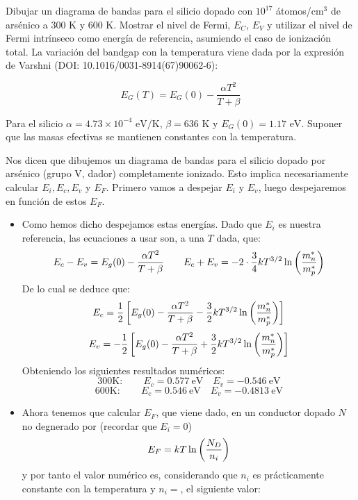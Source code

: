 \begin{texercise}
	Dibujar un diagrama de bandas para el silicio dopado con $10^{17}$ átomos/cm$^3$ de arsénico a 300 K y 600 K. Mostrar el nivel de Fermi, $E_C$, $E_V$ y utilizar el nivel de Fermi intrínseco como energía de referencia, asumiendo el caso de ionización total. La variación del bandgap con la temperatura viene dada por la expresión de Varshni (DOI: 10.1016/0031-8914(67)90062-6):

	\begin{equation}
		E_G(T) = E_G(0) - \frac{\alpha T^2}{T + \beta}
	\end{equation}
	
	Para el silicio $\alpha = 4.73 \times 10^{-4} \text{ eV/K}$, $\beta = 636 \text{ K}$ y $E_G(0) = 1.17 \text{ eV}$. Suponer que las masas efectivas se mantienen constantes con la temperatura.
	
	\tcblower

	Nos dicen que dibujemos un diagrama de bandas para el silicio dopado por arsénico (grupo V, dador) completamente ionizado. Esto implica necesariamente calcular $E_i,E_c,E_v$ y $E_F$. Primero vamos a despejar $E_i$ y $E_v$, luego despejaremos en función de estos $E_F$. 

	\begin{itemize}
		\item Como hemos dicho despejamos estas energías. Dado que $E_i$ es nuestra referencia, las ecuaciones a usar son, a una $T$ dada, que:
		\begin{equation}
			E_c-E_v = E_g(0) - \frac{\alpha T^2}{T+\beta} \qquad E_c+E_v=-2 \cdot \frac{3}{4} kT^{3/2} \ln \left( \frac{m_n^*}{m_p^*} \right)
		\end{equation}
		De lo cual se deduce que:
		\begin{equation}
			E_c = \frac{1}{2} \left[ E_g(0) - \frac{\alpha T^2}{T+\beta} - \frac{3}{2} kT^{3/2} \ln \left( \frac{m_n^*}{m_p^*} \right) \right]
		\end{equation}
		\begin{equation}
			E_v = -\frac{1}{2} \left[ E_g(0) - \frac{\alpha T^2}{T+\beta} + \frac{3}{2} kT^{3/2} \ln \left( \frac{m_n^*}{m_p^*} \right) \right]
		\end{equation}
		Obteniendo los siguientes resultados numéricos:
		\begin{equation}
			\text{300K}: \qquad 
			E_c = 0.577 \ \text{eV} \quad E_v = -0.546 \ \text{eV}
		\end{equation}
		\begin{equation}
			\text{600K}: \qquad 
			E_c = 0.546  \ \text{eV} \quad E_v = -0.4813 \ \text{eV}
		\end{equation}
		\item Ahora tenemos que calcular $E_F$, que viene dado, en un conductor dopado $N$ no degnerado por (recordar que $E_i=0$)
		\begin{equation}
			E_F = kT \ln \left( \frac{N_D}{n_i} \right)
		\end{equation}
		y por tanto el valor numérico es, considerando que $n_i$ es prácticamente constante con la temperatura y $n_i=$, el siguiente valor:


\end{itemize}
\end{texercise}
